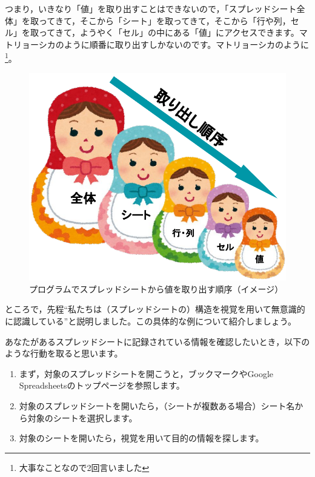 \documentclass[uplatex,a4j]{jsarticle}
\begin{document}
つまり，いきなり「値」を取り出すことはできないので，「スプレッドシート全体」を取ってきて，そこから「シート」を取ってきて，そこから「行や列，セル」を取ってきて，ようやく「セル」の中にある「値」にアクセスできます。マトリョーシカのように順番に取り出すしかないのです。マトリョーシカのように\footnote{大事なことなので2回言いました}。


\begin{figure}[H]
 \centering
 \includegraphics[keepaspectratio, scale=0.5]{images/spreadsheet_matryoshka.pdf}
 \caption{プログラムでスプレッドシートから値を取り出す順序（イメージ）}
 \label{fig:spreadsheet_matryoshka}
\end{figure}



ところで，先程``私たちは（スプレッドシートの）構造を視覚を用いて無意識的に認識している''と説明しました。この具体的な例について紹介しましょう。


あなたがあるスプレッドシートに記録されている情報を確認したいとき，以下のような行動を取ると思います。
\begin{enumerate}
\item まず，対象のスプレッドシートを開こうと，ブックマークやGoogle Spreadsheetsのトップページを参照します。
\item 対象のスプレッドシートを開いたら，（シートが複数ある場合）シート名から対象のシートを選択します。
\item 対象のシートを開いたら，視覚を用いて目的の情報を探します。
\end{enumerate}
\end{document}
